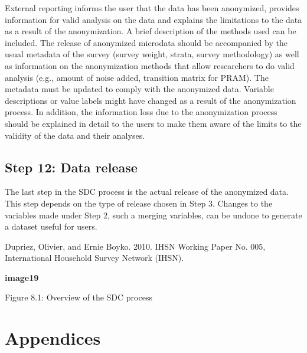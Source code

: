 \documentclass[letterpaper,10pt,english]{sphinxmanual}
\begin{document}
External reporting informs the user that the data has been anonymized,
provides information for valid analysis on the data and explains the
limitations to the data as a result of the anonymization. A brief
description of the methods used can be included. The release of
anonymized microdata should be accompanied by the usual metadata of the
survey (survey weight, strata, survey methodology) as well as
information on the anonymization methods that allow researchers to do
valid analysis (e.g., amount of noise added, transition matrix for
PRAM).  The
metadata must be updated to comply with the anonymized data. Variable
descriptions or value labels might have changed as a result of the
anonymization process. In addition, the information loss due to the
anonymization process should be explained in detail to the users to make
them aware of the limits to the validity of the data and their analyses.


\section{Step 12: Data release}
\label{\detokenize{process:step-12-data-release}}
The last step in the SDC process is the actual release of the anonymized
data. This step depends on the type of release chosen in Step 3. Changes
to the variables made under Step 2, such a merging variables, can be
undone to generate a dataset useful for users.


Dupriez, Olivier, and Ernie Boyko. 2010.  IHSN Working Paper No.
005, International Household Survey Network (IHSN).

{\color{red}\bfseries{}\textbar{}image19\textbar{}}

Figure 8.1: Overview of the SDC process


\chapter{Appendices}
\label{\detokenize{appendices:appendices}}\label{\detokenize{appendices::doc}}

\section{ }
\label{\detokenize{appendices:appendix-a-overview-of-case-study-variables}}
\end{document}
